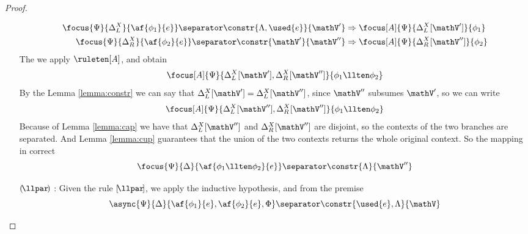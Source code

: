 \begin{proof}
\begin{itemize}
			\begin{align*}
				\focus{\Psi}{\Delta_L^X}{\af{\phi_1}{e}} \separator \constr{\Lambda, \used{e}}{\mathV'} &\Rightarrow \focus[A]{\Psi}{\Delta_L^X[\mathV']}{\phi_1} \\
				\focus{\Psi}{\Delta_R^X}{\af{\phi_2}{e}} \separator \constr{\mathV'}{\mathV''} &\Rightarrow \focus[A]{\Psi}{\Delta_R^X[\mathV'']}{\phi_2} 
			\end{align*}
			The we apply $\ruleten[A]$, and obtain
			$$ \focus[A]{\Psi}{\Delta_L^X[\mathV'], \Delta_R^X[\mathV'']}{\phi_1 \llten \phi_2} $$
			By the Lemma \ref{lemma:constr} we can say that $\Delta_L^X[\mathV'] = \Delta_L^X[\mathV'']$, since $\mathV''$ subsumes $\mathV'$, so we can write
			$$ \focus[A]{\Psi}{\Delta_L^X[\mathV''], \Delta_R^X[\mathV'']}{\phi_1 \llten \phi_2} $$
			Because of Lemma \ref{lemma:cap} we have that $\Delta_L^X[\mathV'']$ and $\Delta_R^X[\mathV'']$ are disjoint, so the contexts of the two branches are separated.
			And Lemma \ref{lemma:cup} guarantees that the union of the two contexts returns the whole original context.
			So the mapping in correct 
			$$ \focus{\Psi}{\Delta}{\af{\phi_1 \llten \phi_2}{e}} \separator \constr{\Lambda}{\mathV''} $$
		\item[$(\!\llpar\!)$]: Given the rule $[\!\llpar\!]$, we apply the inductive hypothesis, and from the premise
			$$ \async{\Psi}{\Delta}{\af{\phi_1}{e}, \af{\phi_2}{e}, \Phi} \separator \constr{\used{e}, \Lambda}{\mathV}$$

\end{itemize}
\end{proof}
